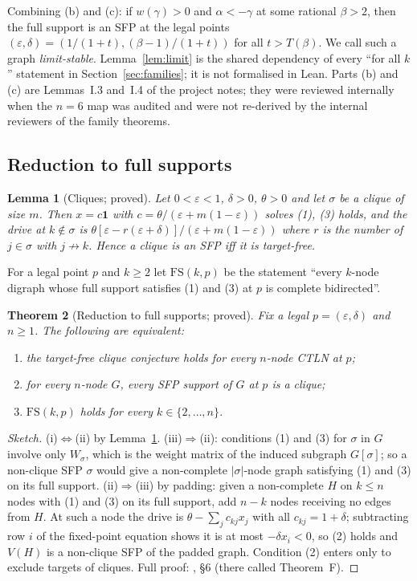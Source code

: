 \documentclass[11pt]{article}
\newtheorem{theorem}{Theorem}[section]
\newtheorem{lemma}[theorem]{Lemma}
\theoremstyle{definition}
\newcommand{\one}{\mathbf{1}}
\newcommand{\eps}{\varepsilon}
\begin{document}
Combining (b) and (c): if $w(\gamma)>0$ and $\alpha<-\gamma$ at some rational $\beta>2$, then the full support
is an SFP at the legal points $(\eps,\delta)=(1/(1+t),(\beta-1)/(1+t))$ for all $t>T(\beta)$. We call such a
graph \emph{limit-stable}. Lemma~\ref{lem:limit} is the shared dependency of every ``for all $k$''
statement in Section~\ref{sec:families}; it is not formalised in Lean. Parts (b) and (c) are Lemmas~I.3 and~I.4 of
the project notes; they were reviewed internally when the $n=6$ map was audited and were not re-derived by the internal reviewers of the
family theorems.

\subsection{Reduction to full supports}
\begin{lemma}[Cliques; proved]\label{lem:clique}
Let $0<\eps<1$, $\delta>0$, $\theta>0$ and let $\sigma$ be a clique of size $m$. Then $x=c\one$ with
$c=\theta/(\eps+m(1-\eps))$ solves (1), (3) holds, and the drive at $k\notin\sigma$ is
$\theta[\eps-r(\eps+\delta)]/(\eps+m(1-\eps))$ where $r$ is the number of $j\in\sigma$ with $j\not\to k$.
Hence a clique is an SFP iff it is target-free.
\end{lemma}

For a legal point $p$ and $k\ge2$ let $\mathrm{FS}(k,p)$ be the statement ``every $k$-node digraph whose full
support satisfies (1) and (3) at $p$ is complete bidirected''.

\begin{theorem}[Reduction to full supports; proved]\label{thm:reduction}
Fix a legal $p=(\eps,\delta)$ and $n\ge1$. The following are equivalent:
\begin{enumerate}
\item[(i)] the target-free clique conjecture holds for every $n$-node CTLN at $p$;
\item[(ii)] for every $n$-node $G$, every SFP support of $G$ at $p$ is a clique;
\item[(iii)] $\mathrm{FS}(k,p)$ holds for every $k\in\{2,\dots,n\}$.
\end{enumerate}
\end{theorem}
\begin{proof}[Sketch]
(i)$\Leftrightarrow$(ii) by Lemma~\ref{lem:clique}. (iii)$\Rightarrow$(ii): conditions (1) and (3) for
$\sigma$ in $G$ involve only $W_\sigma$, which is the weight matrix of the induced subgraph $G[\sigma]$; so a
non-clique SFP $\sigma$ would give a non-complete $|\sigma|$-node graph satisfying (1) and (3) on its full
support. (ii)$\Rightarrow$(iii) by padding: given a non-complete $H$ on $k\le n$ nodes with (1) and (3) on
its full support, add $n-k$ nodes receiving no edges from $H$. At such a node the drive is
$\theta-\sum_jc_{kj}x_j$ with all $c_{kj}=1+\delta$; subtracting row $i$ of the fixed-point equation
shows it is at most $-\delta x_i<0$, so (2) holds and $V(H)$ is a non-clique SFP of the padded graph.
Condition (2) enters only to exclude targets of cliques. Full proof:
, \S6 (there called Theorem~F).
\end{proof}
\end{document}
